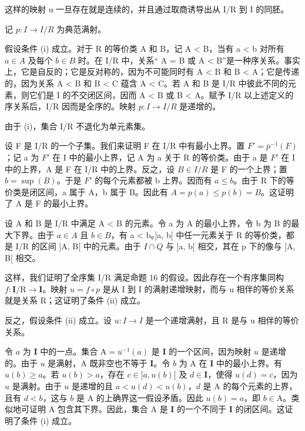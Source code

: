 这样的映射 u 一旦存在就是连续的，并且通过取商诱导出从 I/R 到 I 的同胚。

记 \(p: I \rightarrow I/R\) 为典范满射。

假设条件 (i) 成立。对于 R 的等价类 A 和 B，记 A \textless{} B，当有 a \textless{} b 对所有 \(a \in A\) 及每个 \(b \in B\) 时。在 I/R 中，关系“ A = B 或 A \textless{} B”是一种序关系。事实上，它是自反的；它是反对称的，因为不可能同时有 A \textless{} B 和 B \textless{} A；它是传递的，因为关系 A \textless{} B 和 B \textless{} C 蕴含 A \textless{} C。若 A 和 B 是 I/R 中彼此不同的元素，则它们是 I 的不交闭区间，因而 A \textless{} B 或 B \textless{} A。赋予 I/R 以上述定义的序关系后，I/R 因而是全序的。映射 \(p: I \to I/R\) 是递增的。

由于 (i)，集合 I/R 不退化为单元素集。

设 F 是 I/R 的一个子集。我们来证明 F 在 I/R 中有最小上界。置 \(F' = \overline{p}^{-1}(F)\)；记 a 为 \(F'\) 在 I 中的最小上界，记 A 为 a 关于 R 的等价类。由于 a 是 \(F'\) 在 I 中的上界，A 是 F 在 I/R 中的上界。反之，设 \(B \in I/R\) 是 F 的一个上界；置 \(b = \sup(B)\)。于是 \(F'\) 的每个元素都被 b 上界。因而有 \(a \leqslant b\)。由于 R 下的等价类是闭区间，a 属于 A，b 属于 B。因此有 \(A = p(a) \leqslant p(b) = B\)。这证明了 A 是 F 的最小上界。

设 A 和 B 是 I/R 中满足 A \textless{} B 的元素。令 a 为 A 的最小上界，令 b 为 B 的最大下界。由于 \(a \in A\) 且 \(b \in B\)，有 a \textless{} b。{]}a, b{[} 中任一元素关于 R 的等价类，都是 I/R 的区间 {]}A, B{[} 中的元素。由于 \(I \cap Q\) 与 {]}a, b{[} 相交，其在 p 下的像与 {]}A, B{[} 相交。

这样，我们证明了全序集 I/R 满足命题 16 的假设。因此存在一个有序集同构 \(f \colon \mathbf{I} / \mathrm{R} \to \mathbf{I}\)。映射 \(u = f \circ p\) 是从 I 到 I 的满射递增映射，而与 u 相伴的等价关系就是关系 R；这证明了条件 (ii) 成立。

反之，假设条件 (ii) 成立。设 \(u: I \rightarrow I\) 是一个递增满射，且 R 是与 u 相伴的等价关系。

令 \(a\) 为 \(\mathbf{I}\) 中的一点。集合 \(\mathrm{A} = \overline{u}^{-1}(a)\) 是 \(\mathbf{I}\) 的一个区间，因为映射 \(u\) 是递增的。由于 \(u\) 是满射，A 既非空也不等于 \(\mathbf{I}\)。令 \(b\) 为 A 在 \(\mathbf{I}\) 中的最小上界。有 \(u(b) \geqslant a\)。若 \(u(b) > a\)，存在 \(c \in ]a, u(b)[\) 及 \(d \in \mathbf{I}\)，使得 \(u(d) = c\)，因为 \(u\) 是满射。由于 \(u\) 是递增的且 \(a < u(d) < u(b)\)，\(d\) 是 A 的每个元素的上界，且有 \(d < b\)，这与 \(b\) 是 A 的上确界这一假设矛盾。因此 \(u(b) = a\)，即 \(b \in \mathrm{A}\)。类似地可证明 A 包含其下界。因此，集合 A 是 \(\mathbf{I}\) 的一个不同于 \(\mathbf{I}\) 的闭区间。这证明了条件 (i) 成立。

